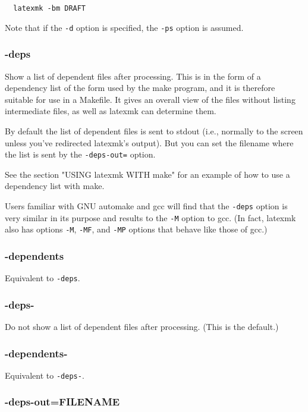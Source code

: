\begin{verbatim}
  latexmk -bm DRAFT
\end{verbatim}

Note that if the \verb|-d| option is specified, the \verb|-ps| option is assumed.

\subsubsection{-deps}

Show a list of dependent files after processing.  This is in the form  of a
dependency list of the form used by the make program, and it is therefore
suitable for use in a Makefile.  It gives an overall view of the files without
listing intermediate files, as well as latexmk can determine them.

By default the list of dependent files is sent to stdout  (i.e., normally  to
the screen unless you've redirected latexmk's output). But you can set the
filename where the list is sent by the \verb|-deps-out=| option.

See  the section "USING latexmk WITH make" for an example of how
to use a dependency list with make.

Users familiar with GNU automake and  gcc  will  find  that  the \verb|-deps|
option is very similar in its purpose and results to the \verb|-M| option to
gcc.  (In fact, latexmk also has options  \verb|-M|,  \verb|-MF|, and
\verb|-MP| options that behave like those of gcc.)

\subsubsection{-dependents}

Equivalent to \verb|-deps|.

\subsubsection{-deps-}

Do  not  show a list of dependent files after processing.  (This is the
default.)

\subsubsection{-dependents-}

Equivalent to \verb|-deps-|.


\subsubsection{-deps-out=FILENAME}

